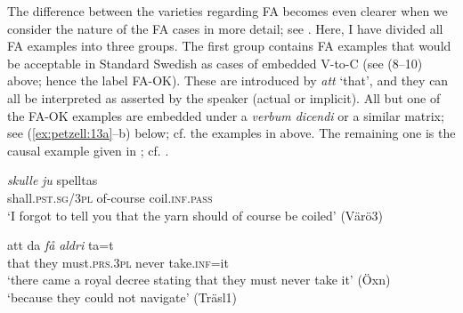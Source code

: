 \documentclass[output=paper,colorlinks,citecolor=brown,draft,draftmode]{langscibook}
\begin{document}
The difference between the varieties regarding FA becomes even clearer when we consider the nature of the FA cases in more detail; see . Here, I have divided all FA examples into three groups. The first group contains FA examples that would be acceptable in Standard Swedish as cases of embedded V-to-C (see (8–10) above; hence the label FA-OK). These are introduced by \textit{att} ‘that’, and they can all be interpreted as asserted by the speaker (actual or implicit). All but one of the FA-OK examples are embedded under a \textit{verbum dicendi} or a similar matrix; see (\ref{ex:petzell:13a}–b) below; cf. the examples in  above. The remaining one is the causal example given in ; cf. .


\ea\label{ex:petzell:13}

\gll    \textit{{skulle}} \textit{{ju}}        spelltas    \\
    shall.\textsc{pst.sg}/3\textsc{pl}  of-course  coil.\textsc{inf}.\textsc{pass}\\
\glt `I forgot to tell you that the yarn should of course be coiled' (Värö3)  \\


\gll    att      da \textit{{få}} \textit{{aldri}} ta=t        \\
    that    they    must.\textsc{prs}.3\textsc{pl}  never    take.\textsc{inf}=it    \\
\glt `there came a royal decree stating that they must never take it’ (Öxn)    \\

\glt `because they could not navigate’ (Träsl1)
\z
\z
\end{document}
